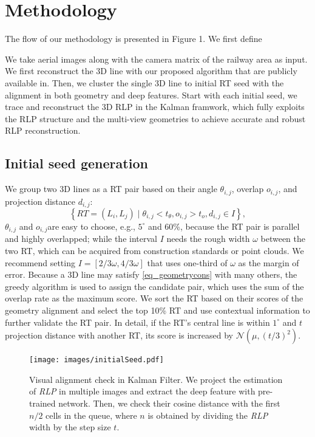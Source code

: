 \section{Methodology}

The flow of our methodology is presented in Figure 1.
We first define 

We take aerial images along with the camera matrix of the railway area as input.
We first reconstruct the 3D line with our proposed algorithm that are publicly available in.
Then,
we cluster the single 3D line to initial RT seed with the alignment in both geometry and deep features.
Start with each initial seed,
we trace and reconstruct the 3D RLP in the Kalman framwork,
which fully exploits the RLP structure and the multi-view geometries to achieve accurate and robust RLP reconstruction.

\subsection{Initial seed generation}

We group two 3D lines as a RT pair based on their angle $\theta_{i,j}$,
overlap $o_{i,j}$,
and projection distance $d_{i,j}$:
\begin{equation}
   \left\{ RT= \left(L_i, L_j\right) \mid \theta_{i,j} < t_\theta, o_{i,j} > t_o, d_{i,j} \in I  \right\},
    \label{eq_geometrycons}
\end{equation}
$\theta_{i,j}$ and $o_{i,j}$are easy to choose,
e.g.,
$5^\circ$ and 60\%,
because the RT pair is parallel and highly overlapped;
while the interval $I$ needs the rough width $\omega$ between the two RT,
which can be acquired from construction standards or point clouds.
We recommend setting $I=\left[2/3\omega,4/3\omega\right]$ that uses one-third of $\omega$ as the margin of error.
Because a 3D line may satisfy \cref{eq_geometrycons} with many others,
the greedy algorithm is used to assign the candidate pair,
which uses the sum of the overlap rate as the maximum score.
We sort the RT based on their scores of the geometry alignment and select the top 10\% RT and use contextual information to further validate the RT pair.
In detail,
if the RT's central line is within $1^\circ$ and $t$ projection distance with another RT,
its score is increased by $\mathcal{N}\left(\mu, \left(t/3\right)^2\right)$.

\begin{figure}[h]
    \centering
    \texttt{[image: images/initialSeed.pdf]}
    \caption{Visual alignment check in Kalman Filter.
    We project the estimation of \textit{RLP} in multiple images and extract the deep feature with pre-trained network.
    Then, 
    we check their cosine distance with the first $n/2$ cells in the queue,
    where $n$ is obtained by dividing the \textit{RLP} width by the step size $t$.}
    \label{fig_visualCheck}
\end{figure}

